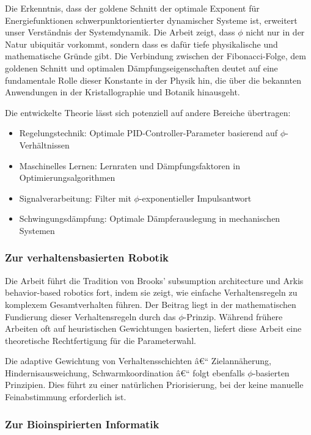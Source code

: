 ﻿\documentclass[a4paper,12pt]{article}
\theoremstyle{definition}
\begin{document}
Die Erkenntnis, dass der goldene Schnitt der optimale Exponent für Energiefunktionen schwerpunktorientierter dynamischer Systeme ist, erweitert unser Verständnis der Systemdynamik. Die Arbeit zeigt, dass $\phi$ nicht nur in der Natur ubiquitär vorkommt, sondern dass es dafür tiefe physikalische und mathematische Gründe gibt. Die Verbindung zwischen der Fibonacci-Folge, dem goldenen Schnitt und optimalen Dämpfungseigenschaften deutet auf eine fundamentale Rolle dieser Konstante in der Physik hin, die über die bekannten Anwendungen in der Kristallographie und Botanik hinausgeht.

Die entwickelte Theorie lässt sich potenziell auf andere Bereiche übertragen:
\begin{itemize}
	\item Regelungstechnik: Optimale PID-Controller-Parameter basierend auf $\phi$-Verhältnissen
	\item Maschinelles Lernen: Lernraten und Dämpfungsfaktoren in Optimierungsalgorithmen
	\item Signalverarbeitung: Filter mit $\phi$-exponentieller Impulsantwort
	\item Schwingungsdämpfung: Optimale Dämpferauslegung in mechanischen Systemen
\end{itemize}

\subsubsection{Zur verhaltensbasierten Robotik}

Die Arbeit führt die Tradition von Brooks' subsumption architecture und Arkis behavior-based robotics fort, indem sie zeigt, wie einfache Verhaltensregeln zu komplexem Gesamtverhalten führen. Der Beitrag liegt in der mathematischen Fundierung dieser Verhaltensregeln durch das $\phi$-Prinzip. Während frühere Arbeiten oft auf heuristischen Gewichtungen basierten, liefert diese Arbeit eine theoretische Rechtfertigung für die Parameterwahl.

Die adaptive Gewichtung von Verhaltensschichten â€“ Zielannäherung, Hindernisausweichung, Schwarmkoordination â€“ folgt ebenfalls $\phi$-basierten Prinzipien. Dies führt zu einer natürlichen Priorisierung, bei der keine manuelle Feinabstimmung erforderlich ist.

\subsubsection{Zur Bioinspirierten Informatik}
\end{document}
